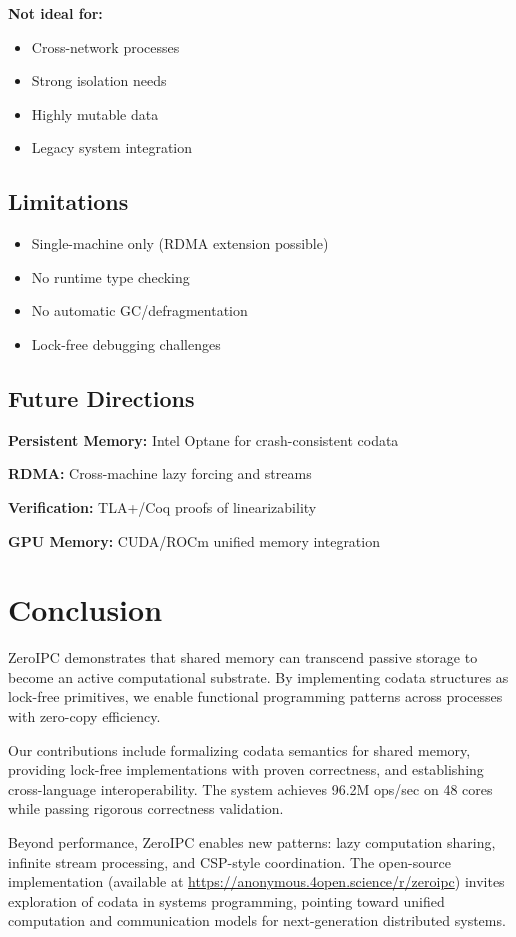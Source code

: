 \documentclass[sigconf,anonymous]{acmart}
\newcommand{\projecturl}{\url{https://anonymous.4open.science/r/zeroipc}}
\begin{document}
\textbf{Not ideal for:}
\begin{itemize}
\item Cross-network processes
\item Strong isolation needs
\item Highly mutable data
\item Legacy system integration
\end{itemize}

\subsection{Limitations}

\begin{itemize}
\item Single-machine only (RDMA extension possible)
\item No runtime type checking
\item No automatic GC/defragmentation
\item Lock-free debugging challenges
\end{itemize}

\subsection{Future Directions}

\textbf{Persistent Memory:} Intel Optane for crash-consistent codata

\textbf{RDMA:} Cross-machine lazy forcing and streams

\textbf{Verification:} TLA+/Coq proofs of linearizability

\textbf{GPU Memory:} CUDA/ROCm unified memory integration

\section{Conclusion}

ZeroIPC demonstrates that shared memory can transcend passive storage to become an active computational substrate. By implementing codata structures as lock-free primitives, we enable functional programming patterns across processes with zero-copy efficiency.

Our contributions include formalizing codata semantics for shared memory, providing lock-free implementations with proven correctness, and establishing cross-language interoperability. The system achieves 96.2M ops/sec on 48 cores while passing rigorous correctness validation.

Beyond performance, ZeroIPC enables new patterns: lazy computation sharing, infinite stream processing, and CSP-style coordination. The open-source implementation (available at \projecturl{}) invites exploration of codata in systems programming, pointing toward unified computation and communication models for next-generation distributed systems.



\end{document}
